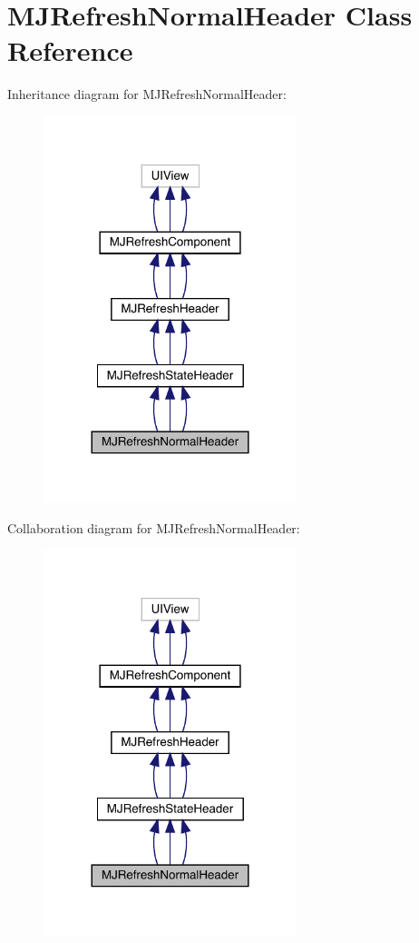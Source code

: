 \hypertarget{interface_m_j_refresh_normal_header}{}\section{M\+J\+Refresh\+Normal\+Header Class Reference}
\label{interface_m_j_refresh_normal_header}


Inheritance diagram for M\+J\+Refresh\+Normal\+Header\+:\nopagebreak
\begin{figure}[H]
\begin{center}
\leavevmode
\includegraphics[width=209pt]{interface_m_j_refresh_normal_header__inherit__graph}
\end{center}
\end{figure}


Collaboration diagram for M\+J\+Refresh\+Normal\+Header\+:\nopagebreak
\begin{figure}[H]
\begin{center}
\leavevmode
\includegraphics[width=209pt]{interface_m_j_refresh_normal_header__coll__graph}
\end{center}
\end{figure}
